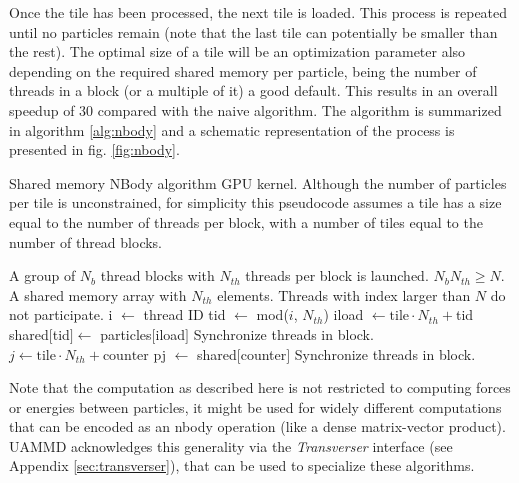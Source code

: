 \documentclass[ twoside,openright,titlepage,numbers=noenddot,%
headinclude,footinclude,cleardoublepage=empty,abstract=on,
BCOR=5mm,paper=a4,fontsize=11pt, dvipsnames
]{scrreprt}
\newcommand{\uammd}{\gls{UAMMD}\xspace}
\begin{document}
Once the tile has been processed, the next tile is loaded. This process is repeated until no particles remain (note that the last tile can potentially be smaller than the rest).
The optimal size of a tile will be an optimization parameter also depending on the required shared memory per particle, being the number of threads in a block (or a multiple of it) a good default.
This results in an overall speedup of 30 compared with the naive algorithm. 
The algorithm is summarized in algorithm \ref{alg:nbody} and a schematic representation of the process is presented in fig. \ref{fig:nbody}.
\begin{algorithm}[H]
  \caption{Shared memory NBody algorithm GPU kernel. Although the number of particles per tile is unconstrained, for simplicity this pseudocode assumes a tile has a size equal to the number of threads per block, with a number of tiles equal to the number of thread blocks.} \label{alg:nbody}
  \begin{algorithmic}[1]
    \Require
    \Statex A group of $N_b$ thread blocks with $N_{th}$ threads per block is launched.
    \Statex $N_bN_{th}\ge N$.
    \Statex A shared memory array with $N_{th}$ elements.
    \Ensure
    \Statex Threads with index larger than $N$ do not participate.
    \State i $\gets$ thread ID 
    \State tid $\gets$ mod($i$, $N_{th}$) 
    \State iload $\gets \text{tile}\cdot N_{th}+$tid
    \State shared$[$tid$]\gets$ particles$[$iload$]$
    \State Synchronize threads in block. 
    \State $j \gets \text{tile}\cdot N_{th} + \text{counter}$
    \State pj $\gets$ shared$[$counter$]$
    \EndFor
    \State Synchronize threads in block. 
    \EndFor
  \end{algorithmic}
\end{algorithm}

Note that the computation as described here is not restricted to computing forces or energies between particles, it might be used for widely different computations that can be encoded as an nbody operation (like a dense matrix-vector product).
\uammd acknowledges this generality via the \emph{Transverser} interface (see Appendix \ref{sec:transverser}), that can be used to specialize these algorithms.
\end{document}
